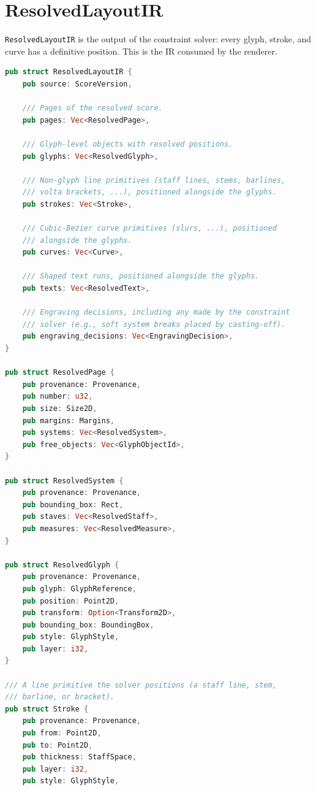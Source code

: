 \documentclass[11pt,letterpaper]{report}
\begin{document}
\section{ResolvedLayoutIR}
\label{sec:layoutir:resolved}

\texttt{ResolvedLayoutIR} is the output of the constraint solver:
every glyph, stroke, and curve has a definitive position. This is the
IR consumed by the renderer.

\begin{lstlisting}[language=Rust]
pub struct ResolvedLayoutIR {
    pub source: ScoreVersion,

    /// Pages of the resolved score.
    pub pages: Vec<ResolvedPage>,

    /// Glyph-level objects with resolved positions.
    pub glyphs: Vec<ResolvedGlyph>,

    /// Non-glyph line primitives (staff lines, stems, barlines,
    /// volta brackets, ...), positioned alongside the glyphs.
    pub strokes: Vec<Stroke>,

    /// Cubic-Bezier curve primitives (slurs, ...), positioned
    /// alongside the glyphs.
    pub curves: Vec<Curve>,

    /// Shaped text runs, positioned alongside the glyphs.
    pub texts: Vec<ResolvedText>,

    /// Engraving decisions, including any made by the constraint
    /// solver (e.g., soft system breaks placed by casting-off).
    pub engraving_decisions: Vec<EngravingDecision>,
}

pub struct ResolvedPage {
    pub provenance: Provenance,
    pub number: u32,
    pub size: Size2D,
    pub margins: Margins,
    pub systems: Vec<ResolvedSystem>,
    pub free_objects: Vec<GlyphObjectId>,
}

pub struct ResolvedSystem {
    pub provenance: Provenance,
    pub bounding_box: Rect,
    pub staves: Vec<ResolvedStaff>,
    pub measures: Vec<ResolvedMeasure>,
}

pub struct ResolvedGlyph {
    pub provenance: Provenance,
    pub glyph: GlyphReference,
    pub position: Point2D,
    pub transform: Option<Transform2D>,
    pub bounding_box: BoundingBox,
    pub style: GlyphStyle,
    pub layer: i32,
}

/// A line primitive the solver positions (a staff line, stem,
/// barline, or bracket).
pub struct Stroke {
    pub provenance: Provenance,
    pub from: Point2D,
    pub to: Point2D,
    pub thickness: StaffSpace,
    pub layer: i32,
    pub style: GlyphStyle,


\end{lstlisting}
\end{document}
